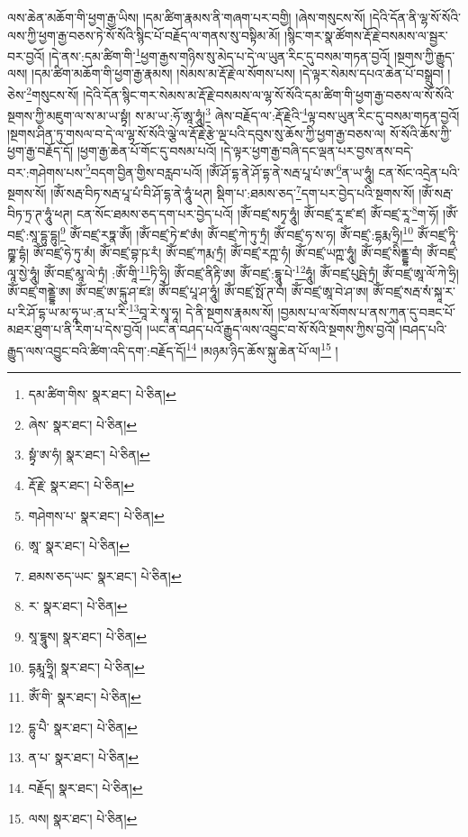 ལས་ཆེན་མཆོག་གི་ཕྱག་རྒྱ་ཡིས། །དམ་ཚིག་རྣམས་ནི་གཞག་པར་བགྱི། །ཞེས་གསུངས་སོ། །དེའི་དོན་ནི་ལྷ་སོ་སོའི་ལས་ཀྱི་ཕྱག་རྒྱ་བཅས་ཏེ་སོ་སོའི་སྙིང་པོ་བརྗོད་ལ་གནས་སུ་བསྟིམ་མོ། །སྙིང་གར་སྣ་ཚོགས་རྡོ་རྗེ་བསམས་ལ་སྦྱར་བར་བྱའོ། །དེ་ནས་:དམ་ཚིག་གི་\footnote{དམ་ཚིག་གིས་  སྣར་ཐང་།  པེ་ཅིན། }ཕྱག་རྒྱས་གཉིས་སུ་མེད་པ་དེ་ལ་ཡུན་རིང་དུ་བསམ་གཏན་བྱའོ། །སྔགས་ཀྱི་རྒྱུད་ལས། །དམ་ཚིག་མཆོག་གི་ཕྱག་རྒྱ་རྣམས། །སེམས་མ་རྡོ་རྗེ་ལ་སོགས་པས། །དེ་ལྟར་སེམས་དཔའ་ཆེན་པོ་བསྒྲུབ། །ཅེས་\footnote{ཞེས་  སྣར་ཐང་།  པེ་ཅིན། }གསུངས་སོ། །དེའི་དོན་སྙིང་གར་སེམས་མ་རྡོ་རྗེ་བསམས་ལ་ལྷ་སོ་སོའི་དམ་ཚིག་གི་ཕྱག་རྒྱ་བཅས་ལ་སོ་སོའི་སྔགས་ཀྱི་མཇུག་ལ་ས་མ་ཡ་སྟྭཾ། ས་མ་ཡ་:ཧོ་ཨཱ་ཧཱུཾ།\footnote{སྟྭཾ་ཨ་ཧཾ།  སྣར་ཐང་།  པེ་ཅིན། } ཞེས་བརྗོད་ལ་:རྡོ་རྗེའི་\footnote{རྡོ་རྗེ་  སྣར་ཐང་།  པེ་ཅིན། }ལྟ་བས་ཡུན་རིང་དུ་བསམ་གཏན་བྱའོ། །སྔགས་ཤིན་ཏུ་གསལ་བ་དེ་ལ་ལྷ་སོ་སོའི་ལྕེ་ལ་རྡོ་རྗེ་རྩེ་ལྔ་པའི་དབུས་སུ་ཆོས་ཀྱི་ཕྱག་རྒྱ་བཅས་ལ། སོ་སོའི་ཆོས་ཀྱི་ཕྱག་རྒྱ་བརྗོད་དོ། །ཕྱག་རྒྱ་ཆེན་པོ་གོང་དུ་བསམ་པའོ། །དེ་ལྟར་ཕྱག་རྒྱ་བཞི་དང་ལྡན་པར་བྱས་ནས་བདེ་བར་:གཤེགས་པས་\footnote{གཤེགས་པ་  སྣར་ཐང་།  པེ་ཅིན། }བདག་བྱིན་གྱིས་བརླབ་པའོ། །ཨོཾ་ཤོ་དྷ་ནེ་ཤོ་དྷ་ནེ་སརྦ་པཱ་པཾ་ཨ་\footnote{ཨཱ་  སྣར་ཐང་།  པེ་ཅིན། }ན་ཡ་ཧཱུཾ། ངན་སོང་འདྲེན་པའི་སྔགས་སོ། །ཨོཾ་སརྦ་བིཏ་སརྦ་པཱ་པཾ་བི་ཤོ་དྷ་ནེ་ཧཱུཾ་ཕཊ། སྡིག་པ་:ཐམས་ཅད་\footnote{ཐམས་ཅད་ཡང་  སྣར་ཐང་།  པེ་ཅིན། }དག་པར་བྱེད་པའི་སྔགས་སོ། །ཨོཾ་སརྦ་བིཏ་ཏྲ་ཊ་ཧཱུཾ་ཕཊ། ངན་སོང་ཐམས་ཅད་དག་པར་བྱེད་པའོ། །ཨོཾ་བཛྲ་སཏྭ་ཧཱུཾ། ཨོཾ་བཛྲ་རཱ་ཛ་ཛ། ཨོཾ་བཛྲ་རཱ་\footnote{ར་  སྣར་ཐང་།  པེ་ཅིན། }ག་ཧོ། །ཨོཾ་བཛྲ་:སཱ་དྷུ་དྷུ།\footnote{སཱ་དྷཱུས།  སྣར་ཐང་།  པེ་ཅིན། } ཨོཾ་བཛྲ་རཏྣ་ཨོཾ། །ཨོཾ་བཛྲ་ཏེ་ཛ་ཨཾ། ཨོཾ་བཛྲ་ཀེ་ཏུ་ཏྲཾ། ཨོཾ་བཛྲ་ཧ་ས་ཧ། ཨོཾ་བཛྲ་:དྷརྨ་ཧྲི།\footnote{དྷརྨཱ་ཧྲཱི།  སྣར་ཐང་།  པེ་ཅིན། } ཨོཾ་བཛྲ་ཏཱི་ཀྵྞ་དྷཾ། ཨོཾ་བཛྲ་ཧེ་ཏུ་མཾ། ཨོཾ་བཛྲ་བྷ་ཥ་རཾ། ཨོཾ་བཛྲ་ཀརྨ་ཏྲཾ། ཨོཾ་བཛྲ་རཀྵ་ཧཾ། ཨོཾ་བཛྲ་ཡཀྵ་ཧཱུཾ། ཨོཾ་བཛྲ་སིནྡྷ་བཾ། ཨོཾ་བཛྲ་ལཱ་སྱེ་ཧཱུཾ། ཨོཾ་བཛྲ་མཱ་ལེ་ཏྲཾ། :ཨོཾ་གཱི་\footnote{ཨོཾ་གི་  སྣར་ཐང་།  པེ་ཅིན། }ཏི་ཧྲི། ཨོཾ་བཛྲ་ནིརྟི་ཨ། ཨོཾ་བཛྲ་:དྷཱུ་པེ་\footnote{དྷུ་པཻ་  སྣར་ཐང་།  པེ་ཅིན། }ཧཱུཾ། ཨོཾ་བཛྲ་པུཥྤེ་ཏྲཾ། ཨོཾ་བཛྲ་ཨཱ་ལོ་ཀེ་ཧྲི། ཨོཾ་བཛྲ་གནྡྷེ་ཨ། ཨོཾ་བཛྲ་ཨ་ངྐུ་ཤ་ཛཿ། ཨོཾ་བཛྲ་པཱ་ཤ་ཧཱུཾ། ཨོཾ་བཛྲ་སྥོ་ཊ་བཾ། ཨོཾ་བཛྲ་ཨཱ་བེ་ཤ་ཨ། ཨོཾ་བཛྲ་སརྦ་སཾ་སྐཱ་ར་པ་རི་ཤོ་དྷ་ཡ་མ་ཧཱ་ཡ་:ན་པ་རི་\footnote{ན་པ་  སྣར་ཐང་།  པེ་ཅིན། }བཱ་རེ་སྭཱ་ཧཱ། དེ་ནི་སྔགས་རྣམས་སོ། །བྱམས་པ་ལ་སོགས་པ་ནས་ཀུན་དུ་བཟང་པོ་མཐར་ཐུག་པ་ནི་རིག་པ་དེས་བྱའོ། །ཡང་ན་བཤད་པའོ་རྒྱུད་ལས་འབྱུང་བ་སོ་སོའི་སྔགས་ཀྱིས་བྱའོ། །བཤད་པའི་རྒྱུད་ལས་འབྱུང་བའི་ཚིག་འདི་དག་:བརྗོད་དོ།\footnote{བརྗོད།  སྣར་ཐང་།  པེ་ཅིན། } །མཉམ་ཉིད་ཆོས་སྐུ་ཆེན་པོ་ལ།\footnote{ལས།  སྣར་ཐང་།  པེ་ཅིན། } །
